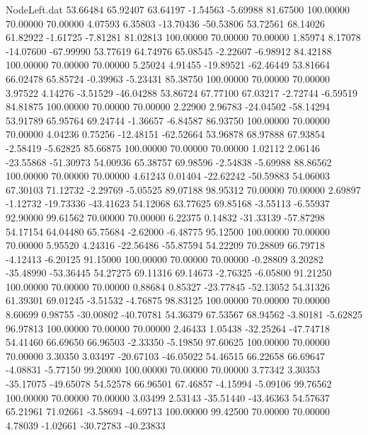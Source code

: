 \begin{filecontents}{NodeLeft.dat}
  53.66484   65.92407   63.64197    -1.54563   -5.69988   81.67500  100.00000   70.00000   70.00000    4.07593    6.35803  -13.70436  -50.53806
  53.72561   68.14026   61.82922    -1.61725   -7.81281   81.02813  100.00000   70.00000   70.00000    1.85974    8.17078  -14.07600  -67.99990
  53.77619   64.74976   65.08545    -2.22607   -6.98912   84.42188  100.00000   70.00000   70.00000    5.25024    4.91455  -19.89521  -62.46449
  53.81664   66.02478   65.85724    -0.39963   -5.23431   85.38750  100.00000   70.00000   70.00000    3.97522    4.14276   -3.51529  -46.04288
  53.86724   67.77100   67.03217    -2.72744   -6.59519   84.81875  100.00000   70.00000   70.00000    2.22900    2.96783  -24.04502  -58.14294
  53.91789   65.95764   69.24744    -1.36657   -6.84587   86.93750  100.00000   70.00000   70.00000    4.04236    0.75256  -12.48151  -62.52664
  53.96878   68.97888   67.93854    -2.58419   -5.62825   85.66875  100.00000   70.00000   70.00000    1.02112    2.06146  -23.55868  -51.30973
  54.00936   65.38757   69.98596    -2.54838   -5.69988   88.86562  100.00000   70.00000   70.00000    4.61243    0.01404  -22.62242  -50.59883
  54.06003   67.30103   71.12732    -2.29769   -5.05525   89.07188   98.95312   70.00000   70.00000    2.69897   -1.12732  -19.73336  -43.41623
  54.12068   63.77625   69.85168    -3.55113   -6.55937   92.90000   99.61562   70.00000   70.00000    6.22375    0.14832  -31.33139  -57.87298
  54.17154   64.04480   65.75684    -2.62000   -6.48775   95.12500  100.00000   70.00000   70.00000    5.95520    4.24316  -22.56486  -55.87594
  54.22209   70.28809   66.79718    -4.12413   -6.20125   91.15000  100.00000   70.00000   70.00000   -0.28809    3.20282  -35.48990  -53.36445
  54.27275   69.11316   69.14673    -2.76325   -6.05800   91.21250  100.00000   70.00000   70.00000    0.88684    0.85327  -23.77845  -52.13052
  54.31326   61.39301   69.01245    -3.51532   -4.76875   98.83125  100.00000   70.00000   70.00000    8.60699    0.98755  -30.00802  -40.70781
  54.36379   67.53567   68.94562    -3.80181   -5.62825   96.97813  100.00000   70.00000   70.00000    2.46433    1.05438  -32.25264  -47.74718
  54.41460   66.69650   66.96503    -2.33350   -5.19850   97.60625  100.00000   70.00000   70.00000    3.30350    3.03497  -20.67103  -46.05022
  54.46515   66.22658   66.69647    -4.08831   -5.77150   99.20000  100.00000   70.00000   70.00000    3.77342    3.30353  -35.17075  -49.65078
  54.52578   66.96501   67.46857    -4.15994   -5.09106   99.76562  100.00000   70.00000   70.00000    3.03499    2.53143  -35.51440  -43.46363
  54.57637   65.21961   71.02661    -3.58694   -4.69713  100.00000   99.42500   70.00000   70.00000    4.78039   -1.02661  -30.72783  -40.23833

\end{filecontents}
